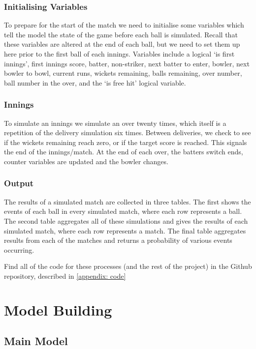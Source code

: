 \subsubsection{Initialising Variables}

To prepare for the start of the match we need to initialise some variables which tell the model the state of the game before each ball is simulated. Recall that these variables are altered at the end of each ball, but we need to set them up here prior to the first ball of each innings. Variables include a logical `is first innings', first innings score, batter, non-striker, next batter to enter, bowler, next bowler to bowl, current runs, wickets remaining, balls remaining, over number, ball number in the over, and the `is free hit' logical variable.

\subsubsection{Innings}

To simulate an innings we simulate an over twenty times, which itself is a repetition of the delivery simulation six times. Between deliveries, we check to see if the wickets remaining reach zero, or if the target score is reached. This signals the end of the innings/match. At the end of each over, the batters switch ends, counter variables are updated and the bowler changes.

\subsubsection{Output}

The results of a simulated match are collected in three tables. The first shows the events of each ball in every simulated match, where each row represents a ball. The second table aggregates all of these simulations and gives the results of each simulated match, where each row represents a match. The final table aggregates results from each of the matches and returns a probability of various events occurring.

Find all of the code for these processes (and the rest of the project) in the Github repository, described in \cref{appendix: code}

\section{Model Building}
\label{sec: models}

\subsection{Main Model}

